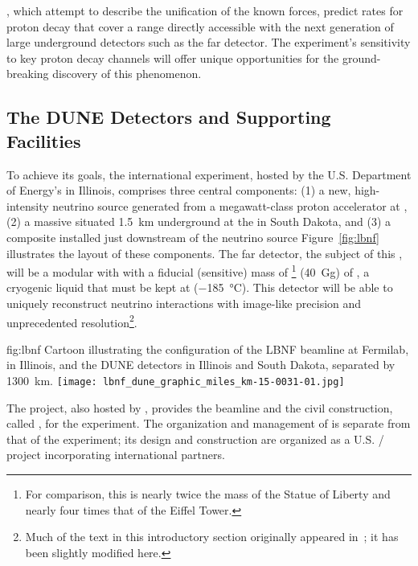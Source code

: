 , which attempt to describe the unification of the known forces, predict rates for proton decay that cover a range directly accessible with the next generation of large underground detectors such as the  far detector. The experiment's sensitivity to key proton decay channels will offer unique opportunities for the ground-breaking discovery of this phenomenon.

\subsection{The DUNE Detectors and Supporting Facilities}



To achieve its goals, the international  experiment, hosted by the U.S. Department of Energy's  in Illinois, comprises three central components: (1) a new, high-intensity neutrino source generated from a megawatt-class proton accelerator at , (2)  a massive  situated \SI{1.5}{\km} underground at the  in South Dakota, and (3) a composite  installed just downstream of the neutrino source 
Figure~\ref{fig:lbnf} illustrates the layout of these components. The far detector, the subject of this , will be a modular  with 
with a fiducial (sensitive) mass of
\fdfiducialmass{}\footnote{For comparison, this is nearly twice the mass of the Statue of Liberty and nearly four times that of the Eiffel Tower.} 
(\SI{40}{\giga\gram}) 
of , a cryogenic liquid that must be kept at \lartemp{} (\SI{-185}{\degree}C). This detector will be able to  uniquely reconstruct neutrino interactions with image-like precision and unprecedented resolution\footnote{Much of the text in this introductory section originally appeared in~\cite{Adams:2013qkq}; it has been slightly modified here.}. 

\begin{dunefigure}{fig:lbnf}{ 	
Cartoon illustrating the configuration of the LBNF beamline at Fermilab, in Illinois, and the DUNE detectors in Illinois and South Dakota, separated by \SI{1300}{km}.}
\texttt{[image: lbnf\_dune\_graphic\_miles\_km-15-0031-01.jpg]}
\end{dunefigure}



The  project, also hosted by , provides the beamline and the civil construction, called , for the  experiment.  %
The organization and management of  is separate from that of the experiment; its design and construction are organized as a U.S. / project incorporating international partners. 

